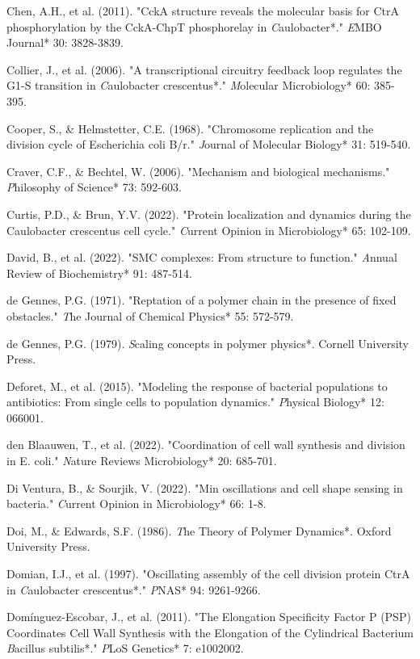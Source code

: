 \documentclass[11pt,a4paper]{article}
\begin{document}
Chen, A.H., et al. (2011). "CckA structure reveals the molecular basis for CtrA phosphorylation by the CckA-ChpT phosphorelay in \textit*Caulobacter*." \textit*EMBO Journal* 30: 3828-3839.

Collier, J., et al. (2006). "A transcriptional circuitry feedback loop regulates the G1-S transition in \textit*Caulobacter crescentus*." \textit*Molecular Microbiology* 60: 385-395.

Cooper, S., & Helmstetter, C.E. (1968). "Chromosome replication and the division cycle of Escherichia coli B/r." \textit*Journal of Molecular Biology* 31: 519-540.

Craver, C.F., & Bechtel, W. (2006). "Mechanism and biological mechanisms." \textit*Philosophy of Science* 73: 592-603.

Curtis, P.D., & Brun, Y.V. (2022). "Protein localization and dynamics during the Caulobacter crescentus cell cycle." \textit*Current Opinion in Microbiology* 65: 102-109.

David, B., et al. (2022). "SMC complexes: From structure to function." \textit*Annual Review of Biochemistry* 91: 487-514.

de Gennes, P.G. (1971). "Reptation of a polymer chain in the presence of fixed obstacles." \textit*The Journal of Chemical Physics* 55: 572-579.

de Gennes, P.G. (1979). \textit*Scaling concepts in polymer physics*. Cornell University Press.

Deforet, M., et al. (2015). "Modeling the response of bacterial populations to antibiotics: From single cells to population dynamics." \textit*Physical Biology* 12: 066001.

den Blaauwen, T., et al. (2022). "Coordination of cell wall synthesis and division in E. coli." \textit*Nature Reviews Microbiology* 20: 685-701.

Di Ventura, B., & Sourjik, V. (2022). "Min oscillations and cell shape sensing in bacteria." \textit*Current Opinion in Microbiology* 66: 1-8.

Doi, M., & Edwards, S.F. (1986). \textit*The Theory of Polymer Dynamics*. Oxford University Press.

Domian, I.J., et al. (1997). "Oscillating assembly of the cell division protein CtrA in \textit*Caulobacter crescentus*." \textit*PNAS* 94: 9261-9266.

Domínguez-Escobar, J., et al. (2011). "The Elongation Specificity Factor P (PSP) Coordinates Cell Wall Synthesis with the Elongation of the Cylindrical Bacterium \textit*Bacillus subtilis*." \textit*PLoS Genetics* 7: e1002002.
\end{document}
